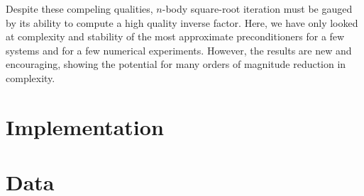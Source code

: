\documentclass[letterpaper,twocolumn,amsmath,amsfont,amssymb,english,aps,jcp,preprintnumbers,groupaddress,nofootinbib,tightenlines,floatfix]{revtex4}
\theoremstyle{plain}
\theoremstyle{remark}
\theoremstyle{plain}
\begin{document}
Despite these compeling qualities, $n$-body square-root iteration must be gauged by its ability to compute 
a high quality inverse factor.   Here, we have only looked at complexity and stability of the most 
approximate preconditioners for a few systems and for a few numerical experiments.  However, the results are 
new and encouraging, showing the potential for  many orders of magnitude reduction in complexity.

\appendix 

\section{Implementation}




\section{Data} \label{data}








\end{document}
